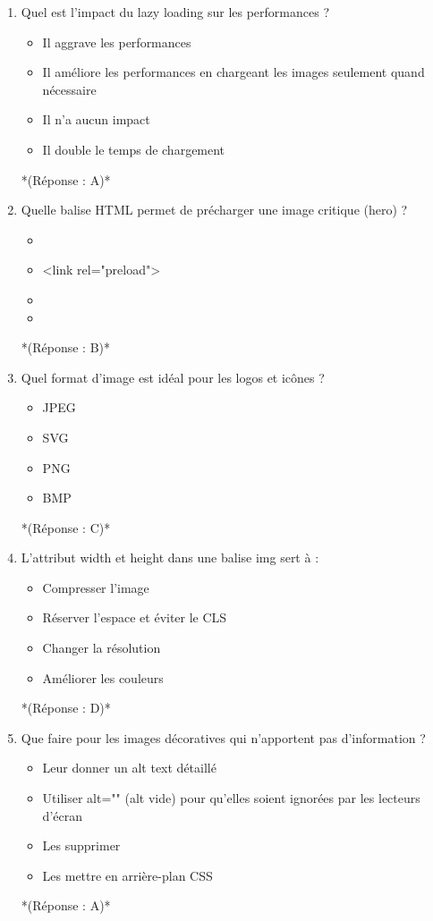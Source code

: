 \documentclass[12pt,a4paper,twoside]{report}
\begin{document}
\begin{enumerate}
\item Quel est l'impact du lazy loading sur les performances ?
\begin{itemize}
\item[A)] Il aggrave les performances
\item[B)] Il améliore les performances en chargeant les images seulement quand nécessaire
\item[C)] Il n'a aucun impact
\item[D)] Il double le temps de chargement
\end{itemize}
*(Réponse : A)*

\item Quelle balise HTML permet de précharger une image critique (hero) ?
\begin{itemize}
\item[A)] <img preload>
\item[B)] <link rel="preload">
\item[C)] <meta preload>
\item[D)] <script preload>
\end{itemize}
*(Réponse : B)*

\item Quel format d'image est idéal pour les logos et icônes ?
\begin{itemize}
\item[A)] JPEG
\item[B)] SVG
\item[C)] PNG
\item[D)] BMP
\end{itemize}
*(Réponse : C)*

\item L'attribut width et height dans une balise img sert à :
\begin{itemize}
\item[A)] Compresser l'image
\item[B)] Réserver l'espace et éviter le CLS
\item[C)] Changer la résolution
\item[D)] Améliorer les couleurs
\end{itemize}
*(Réponse : D)*

\item Que faire pour les images décoratives qui n'apportent pas d'information ?
\begin{itemize}
\item[A)] Leur donner un alt text détaillé
\item[B)] Utiliser alt="" (alt vide) pour qu'elles soient ignorées par les lecteurs d'écran
\item[C)] Les supprimer
\item[D)] Les mettre en arrière-plan CSS
\end{itemize}
*(Réponse : A)*


\end{enumerate}
\end{document}
